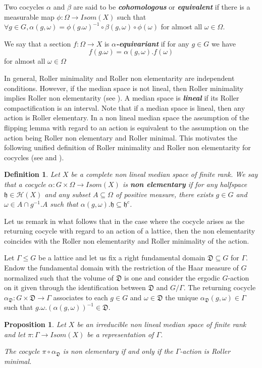 \documentclass{amsart}
\numberwithin{equation}{section}
\newtheorem{prop}[thm]{Proposition}
\newtheorem{defi}[thm]{Definition}
\newcommand{\HH}{\mathcal{H}}     %
\newcommand{\hh}{\mathfrak{h}}    %
\theoremstyle{definition}
\begin{document}
Two cocycles $\alpha$ and $\beta$ are said to be \textbf{\textit{cohomologous}} or \textbf{\textit{equivalent}} if there is a measurable map $\phi: \Omega \to Isom(X)$ such that $\forall g \in G, \alpha(g,\omega) = \phi(g.\omega)^{-1}\circ\beta(g,\omega)\circ \phi(\omega)$ for almost all $\omega \in \Omega$.  \par 
 We say that a section $f:\Omega \rightarrow X$ is \textbf{\textit{$\alpha$-equivariant}} if for any $g\in G$ we have 
\[
f(g.\omega)=\alpha(g,\omega). f(\omega)
\]
for almost all $\omega\in\Omega$




In general, Roller minimality and Roller non elementarity are independent conditions. However, if the median space is not lineal, then Roller minimality implies Roller non elementarity (see \cite[Proposition 6.4]{Messaci}). A median space is \textbf{\textit{lineal}} if its Roller compactification is an interval. Note that if a median space is lineal, then any action is Roller elementary. In a non lineal median space the assumption of the flipping lemma with regard to an action is equivalent to the assumption on the action being Roller non elementary and Roller minimal. This motivates the following unified definition of Roller minimality and Roller non elementarity for cocycles (see \cite[Section 3]{Furstenberg-Bourbaki} and \cite[Appendix 7.b]{bader2006superrigidity}).
\begin{defi}\label{defi_non_elementary_practical_defi}
Let $X$ be a complete non lineal median space of finite rank.
    We say that a cocycle $\alpha:G\times\Omega\rightarrow Isom(X)$ is \textit{\textbf{non elementary}} if for any halfspace $\hh\in\HH(X)$ and any subset $A\subseteq \Omega$ of positive measure, there exists $g\in G$ and $\omega\in A \cap g^{-1}.A$ such that $\alpha(g,\omega).\hh\subseteq \hh^c$.
\end{defi}
Let us remark in what follows that in the case where the cocycle arises as the returning cocycle with regard to an action of a lattice, then the non elementarity coincides with the Roller non elementarity and Roller minimality of the action.\par 
Let $\Gamma\leq G$ be a lattice and let us fix a right fundamental domain $\mathfrak{D}\subseteq G$ for $\Gamma$. Endow the fundamental domain with the restriction of the Haar measure of $G$ normalized such that the volume of $\mathfrak{D}$ is one and consider the ergodic $G$-action on it given through the identification between  $\mathfrak{D}$ and $G/\Gamma$. The returning cocycle $ \alpha_{\mathfrak{D}}:G\times \mathfrak{D}\rightarrow\Gamma 
$ associates to each $g\in G$ and $\omega\in\mathfrak{D}$ the unique $\alpha_\mathfrak{D}(g,\omega)\in \Gamma$ such that $g.\omega.(\alpha(g,\omega))^{-1}\in \mathfrak{D}$.
\begin{prop}\label{prop_elementarity_cocycle_vs_homomorphism}
    Let $X$ be an irreducible non lineal median space of finite rank and let $\pi:\Gamma\rightarrow Isom(X)$ be a representation of $\Gamma$.\par 
    The cocycle $\pi\circ \alpha_\mathfrak{D}$ is non elementary if and only if the $\Gamma$-action is Roller minimal.
\end{prop}
\end{document}
